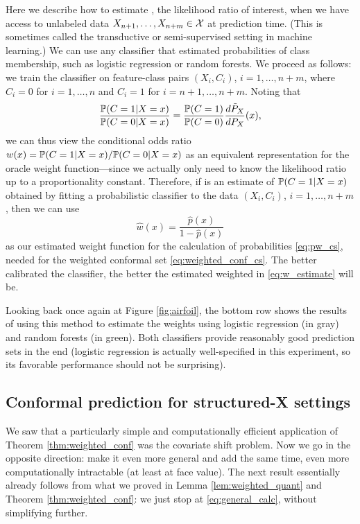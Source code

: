 \documentclass{article}
\begin{document}
Here we describe how to estimate , the likelihood ratio
of interest, when we have access to unlabeled data $X_{n+1},\dots,X_{n+m} \in
\cX$ at prediction time. (This is sometimes called the transductive or
semi-supervised setting in machine learning.) We can use any classifier that
estimated probabilities of class membership, such as logistic regression or
random forests. We proceed as follows: we train the classifier on feature-class
pairs $(X_i,C_i)$, $i=1,\ldots,n+m$,  where $C_i=0$ for $i=1,\ldots,n$ and
$C_i=1$ for $i=n+1,\ldots,n+m$. Noting that   
\[
\frac{\P(C=1 | X=x)}{\P(C=0 | X=x)}
= \frac{\P(C=1)}{\P(C=0)} \frac{d\tP_X}{dP_X}(x),
\]
we can thus view the conditional odds ratio $w(x)=\P(C=1|X=x)/\P(C=0|X=x)$ as an
equivalent representation for the oracle weight function---since we actually
only need to know the likelihood ratio up to a proportionality 
constant. Therefore, if  is an estimate of $\P(C=1|X=x)$
obtained by fitting a probabilistic classifier to the data $(X_i,C_i)$,
$i=1,\ldots,n+m$, then we can use   
\begin{equation}
\label{eq:w_estimate}
\hat{w}(x) = \frac{\hat{p}(x)}{1-\hat{p}(x)}
\end{equation}
as our estimated weight function for the calculation of probabilities
\eqref{eq:pw_cs}, needed for the weighted conformal set
\eqref{eq:weighted_conf_cs}. The better calibrated the classifier, the better
the estimated weighted in \eqref{eq:w_estimate} will be.  

Looking back once again at Figure \ref{fig:airfoil}, the bottom row shows the
results of using this method to estimate the weights using logistic regression
(in gray) and random forests (in green). Both classifiers provide reasonably
good prediction sets in the end (logistic regression is actually well-specified 
in this experiment, so its favorable performance should not be surprising). 

\subsection{Conformal prediction for structured-X settings}

We saw that a particularly simple and computationally efficient application of
Theorem \ref{thm:weighted_conf} was the covariate shift problem. Now we go in
the opposite direction: make it even more general and add the same time, even
more computationally intractable (at least at face value). The next result
essentially already follows from what we proved in Lemma
\ref{lem:weighted_quant} and Theorem \ref{thm:weighted_conf}: we just stop at
\eqref{eq:general_calc}, without simplifying further. 
\end{document}
